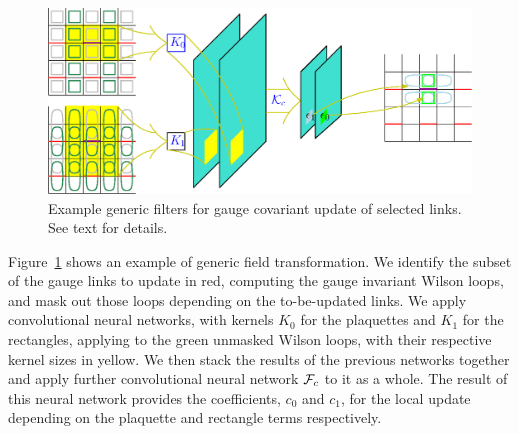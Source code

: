 \begin{figure}
	\centering
	\includegraphics[width=\textwidth]{filters.eps}
	\caption{\label{fig:filters}Example generic filters for gauge covariant update of selected links.  See text for details.}
\end{figure}

Figure~\ref{fig:filters} shows an example of generic field transformation.
We identify the subset of the gauge links to update in red, computing the
gauge invariant Wilson loops, and mask out those loops depending on the
to-be-updated links.
We apply convolutional neural networks, with kernels $K_0$ for the plaquettes
and $K_1$ for the rectangles, applying to the green unmasked Wilson loops,
with their respective kernel sizes in yellow.
We then stack the results of the previous networks together and apply further
convolutional neural network $\mathcal{F}_c$ to it as a whole.
The result of this neural network provides the coefficients, $c_0$ and $c_1$,
for the local update depending on the plaquette and rectangle terms respectively.
